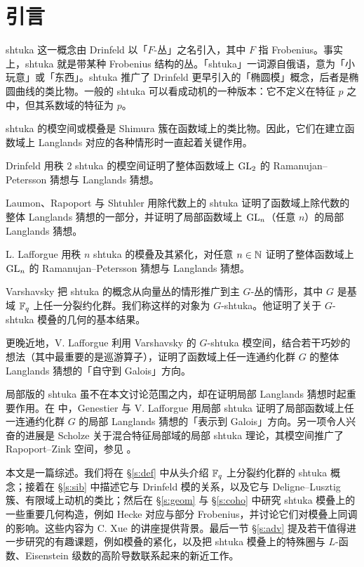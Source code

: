 
\section{引言}

shtuka 这一概念由 Drinfeld \cite{Dr-FBun} 以「$F$-丛」之名引入，其中 $F$ 指 Frobenius。事实上，shtuka 就是带某种 Frobenius 结构的丛。「shtuka」一词源自俄语，意为「小玩意」或「东西」。shtuka 推广了 Drinfeld 更早引入的「椭圆模」概念，后者是椭圆曲线的类比物。一般的 shtuka 可以看成动机的一种版本：它不定义在特征 $p$ 之中，但其系数域的特征为 $p$。

shtuka 的模空间或模叠是 Shimura 簇在函数域上的类比物。因此，它们在建立函数域上 Langlands 对应的各种情形时一直起着关键作用。

Drinfeld \cite{Dr-Pet, Dr-comp} 用秩 $2$ shtuka 的模空间证明了整体函数域上 $\textup{GL}_{2}$ 的 Ramanujan–Petersson 猜想与 Langlands 猜想。

Laumon、Rapoport 与 Shtuhler \cite{LRS} 用除代数上的 shtuka 证明了函数域上除代数的整体 Langlands 猜想的一部分，并证明了局部函数域上 $\textup{GL}_{n}$（任意 $n$）的局部 Langlands 猜想。

L. Lafforgue \cite{LLaff} 用秩 $n$ shtuka 的模叠及其紧化，对任意 $n\in\mathbb{N}$ 证明了整体函数域上 $\textup{GL}_{n}$ 的 Ramanujan–Petersson 猜想与 Langlands 猜想。

Varshavsky \cite{Var} 把 shtuka 的概念从向量丛的情形推广到主 $G$-丛的情形，其中 $G$ 是基域 $\mathbb{F}_{q}$ 上任一分裂约化群。我们称这样的对象为 $G$-shtuka。他证明了关于 $G$-shtuka 模叠的几何的基本结果。

更晚近地，V. Lafforgue \cite{VLaff} 利用 Varshavsky 的 $G$-shtuka 模空间，结合若干巧妙的想法（其中最重要的是巡游算子），证明了函数域上任一连通约化群 $G$ 的整体 Langlands 猜想的「自守到 Galois」方向。

局部版的 shtuka 虽不在本文讨论范围之内，却在证明局部 Langlands 猜想时起重要作用。在 \cite{GL} 中，Genestier 与 V. Lafforgue 用局部 shtuka 证明了局部函数域上任一连通约化群 $G$ 的局部 Langlands 猜想的「表示到 Galois」方向。另一项令人兴奋的进展是 Scholze 关于混合特征局部域的局部 shtuka 理论，其模空间推广了 Rapoport–Zink 空间，参见 \cite{S-Berkeley}。

本文是一篇综述。我们将在 \S\ref{s:def} 中从头介绍 $\mathbb{F}_{q}$ 上分裂约化群的 shtuka 概念；接着在 \S\ref{s:sib} 中描述它与 Drinfeld 模的关系，以及它与 Deligne–Lusztig 簇、有限域上动机的类比；然后在 \S\ref{s:geom} 与 \S\ref{s:coho} 中研究 shtuka 模叠上的一些重要几何构造，例如 Hecke 对应与部分 Frobenius，并讨论它们对模叠上同调的影响。这些内容为 C. Xue \cite{Xue} 的讲座提供背景。最后一节 \S\ref{s:adv} 提及若干值得进一步研究的有趣课题，例如模叠的紧化，以及把 shtuka 模叠上的特殊圈与 $L$-函数、Eisenstein 级数的高阶导数联系起来的新近工作。

